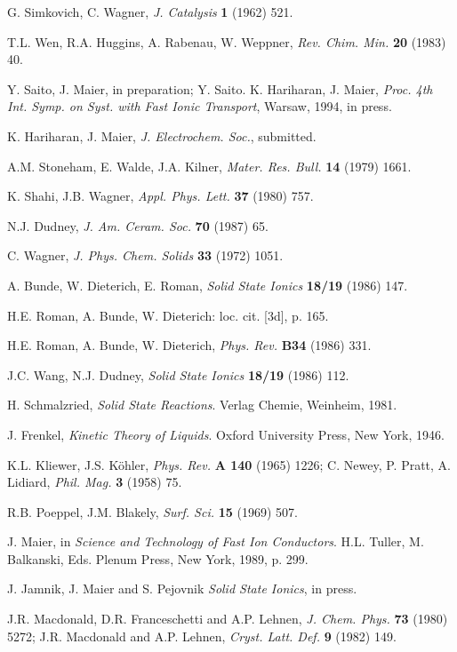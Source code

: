 \documentclass{elsart}
\begin{document}
\begin{thebibliography}{999}
 G. Simkovich, C. Wagner, {\em J. Catalysis\/} {\bf 1} (1962) 521. 

 T.L. Wen, R.A. Huggins, A. Rabenau, W. Weppner, {\em Rev. Chim.
Min.\/} {\bf 20} (1983) 40.

 Y. Saito, J. Maier, in preparation; Y. Saito. K.
Hariharan, J. Maier, {\em Proc. 4th Int. Symp. on Syst. with Fast
  Ionic Transport\/}, Warsaw, 1994, in press.

 K. Hariharan, J. Maier, {\em J. Electrochem. Soc.\/},
  submitted.  

 A.M. Stoneham, E. Walde, J.A. Kilner, {\em Mater. Res. Bull.\/} 
{\bf 14} (1979) 1661.

 K. Shahi, J.B. Wagner, {\em Appl. Phys. Lett.\/} {\bf 37}
(1980) 757. 

 N.J. Dudney, {\em J. Am. Ceram. Soc.\/} {\bf 70} (1987) 65.

 C. Wagner, {\em J. Phys. Chem. Solids\/} {\bf 33} (1972) 1051.

 A. Bunde, W. Dieterich, E. Roman, {\em Solid State Ionics\/} {\bf 
18/19} (1986) 147.

 H.E. Roman, A. Bunde, W. Dieterich: loc. cit. [3d], p. 165.

 H.E. Roman, A. Bunde, W. Dieterich, {\em Phys. Rev.\/} {\bf B34}
(1986) 331.

 J.C. Wang, N.J. Dudney, {\em Solid State Ionics\/} {\bf 18/19}
(1986) 112.

 H. Schmalzried, {\em Solid State Reactions\/}. Verlag Chemie,
Weinheim, 1981.

 J. Frenkel, {\em Kinetic Theory of Liquids\/}. Oxford University
Press, New York, 1946.

 K.L. Kliewer, J.S. K\"ohler, {\em Phys. Rev.\/} {\bf A 140} 
(1965) 1226; C. Newey, P. Pratt, A. Lidiard, {\em Phil. Mag.\/} {\bf 3} (1958)
75.  

 R.B. Poeppel, J.M. Blakely, {\em Surf. Sci.\/} {\bf 15} (1969)
  507.

 J. Maier, in {\em Science and Technology of Fast Ion
  Conductors\/}. H.L. Tuller, M. Balkanski, Eds. Plenum Press, New York, 1989,
p. 299.  

 J. Jamnik, J. Maier and S. Pejovnik {\em Solid State Ionics},
  in press. 

 J.R. Macdonald, D.R. Franceschetti and A.P. Lehnen, {\em
    J. Chem. Phys.\/} {\bf 73} (1980) 5272; J.R. Macdonald and A.P. Lehnen,
  {\em Cryst. Latt. Def.\/} {\bf 9} (1982) 149.


\end{thebibliography}
\end{document}
